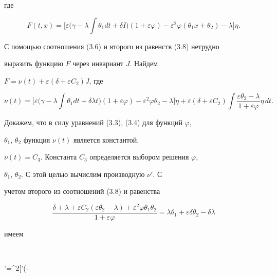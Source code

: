 где 


$$ 


F(t,x)=\bigg[\varepsilon\bigg(\gamma-\lambda\int\theta_1dt+ 


\delta I\bigg)(1+\varepsilon\varphi)- 


\varepsilon^2\varphi(\theta_1x+\theta_2)-\lambda\bigg]\eta. 


$$ 


С помощью соотношения (3.6) и второго из равенств (3.8) нетрудно 


выразить функцию $F$ через инвариант $J$. Найдем 


$F=\nu(t)+\varepsilon(\delta+\varepsilon C_2)J$, где 


\begin{equation} 


\nu(t)=\bigg[\varepsilon\bigg(\gamma-\lambda\int\theta_1dt+ 


\delta\lambda t\bigg)(1+\varepsilon\varphi)-\varepsilon^2 


\varphi\theta_2-\lambda\bigg]\eta+\varepsilon 


(\delta+\varepsilon C_2)\int\frac{\varepsilon\theta_2-\lambda} 


{1+\varepsilon\varphi}\eta\,dt. \tag{3.10} 


\end{equation} 


 


Докажем, что в силу уравнений (3.3), (3.4) для функций $\varphi$, 


$\theta_1$, $\theta_2$ функция $\nu(t)$ является константой, 


$\nu(t)=C_3$. Константа $C_3$ определяется выбором решения $\varphi$, 


$\theta_1$, $\theta_2$. С этой целью вычислим производную $\nu'$. С 


учетом второго из соотношений (3.8) и равенства 


$$ 


\frac{\delta+\lambda+\varepsilon C_2(\varepsilon\theta_2-\lambda) 


+\varepsilon^2\varphi\theta_1\theta_2} 


{1+\varepsilon\varphi}=\lambda\theta_1+\varepsilon\delta\theta_2- 


\delta\lambda 


$$ 


имеем 


$$


\nu'=\varepsilon^2\eta\bigg[\varphi'\bigg(\gamma-\lambda\int 


